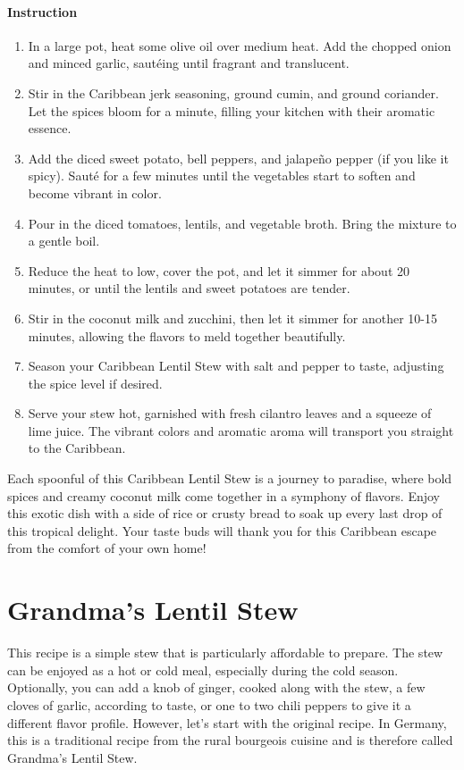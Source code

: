 \paragraph{Instruction} 
\begin{enumerate}[topsep=0pt,itemsep=-1ex,partopsep=1ex,parsep=1ex]
	\item In a large pot, heat some olive oil over medium heat. Add the chopped onion and minced garlic, sautéing until fragrant and translucent.
	\item Stir in the Caribbean jerk seasoning, ground cumin, and ground coriander. Let the spices bloom for a minute, filling your kitchen with their aromatic essence.
	\item Add the diced sweet potato, bell peppers, and jalapeño pepper (if you like it spicy). Sauté for a few minutes until the vegetables start to soften and become vibrant in color.
	\item Pour in the diced tomatoes, lentils, and vegetable broth. Bring the mixture to a gentle boil.
	\item Reduce the heat to low, cover the pot, and let it simmer for about 20 minutes, or until the lentils and sweet potatoes are tender.
	\item Stir in the coconut milk and zucchini, then let it simmer for another 10-15 minutes, allowing the flavors to meld together beautifully.
	\item Season your Caribbean Lentil Stew with salt and pepper to taste, adjusting the spice level if desired.
	\item Serve your stew hot, garnished with fresh cilantro leaves and a squeeze of lime juice. The vibrant colors and aromatic aroma will transport you straight to the Caribbean.
\end{enumerate}

Each spoonful of this Caribbean Lentil Stew is a journey to paradise, where bold spices and creamy coconut milk come together in a symphony of flavors. Enjoy this exotic dish with a side of rice or crusty bread to soak up every last drop of this tropical delight. Your taste buds will thank you for this Caribbean escape from the comfort of your own home!
\clearpage

\section{Grandma's Lentil Stew}
\label{grandmaslentilsstew}

This recipe is a simple stew that is particularly affordable to prepare. The stew can be enjoyed as a hot or cold meal, especially during the cold season. Optionally, you can add a knob of ginger, cooked along with the stew, a few cloves of garlic, according to taste, or one to two chili peppers to give it a different flavor profile. However, let's start with the original recipe. In Germany, this is a traditional recipe from the rural bourgeois cuisine and is therefore called Grandma's Lentil Stew.


